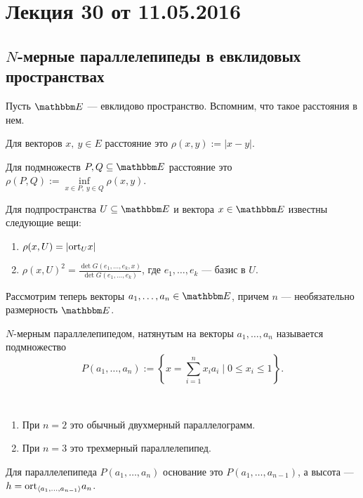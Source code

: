 


\section{Лекция 30 от 11.05.2016}

\subsection*{$N$-мерные параллелепипеды в евклидовых пространствах}

Пусть $\E$ --- евклидово пространство. Вспомним, что такое расстояния в нем.

Для векторов $x,\ y \in E$ расстояние это $\rho(x, y):= |x - y|$.

Для подмножеств $P, Q \subseteq \E$ расстояние это $\rho(P, Q) := \inf\limits_{x \in P,\ y \in Q} \rho(x, y)$.

Для подпространства $U \subseteq \E$ и вектора $x \in \E$ известны следующие вещи:
\begin{enumerate}
\item $\rho(x, U) = |\mathrm{ort}_Ux|$
\item $\rho(x, U)^2 = \frac{\det G(e_1, \ldots, e_k, x)}{\det G(e_1, \ldots, e_k)}$, где $e_1, \ldots, e_k$ --- базис в $U$.
\end{enumerate}

Рассмотрим теперь векторы $a_1, \ldots, a_n \in \E$, причем $n$ --- необязательно размерность $\E$.
\begin{Def}
$N$-мерным параллелепипедом, натянутым на векторы $a_1, \ldots, a_n$ называется подмножество 
$$
P(a_1, \ldots, a_n) := \left\{ x = \sum_{i = 1}^n x_ia_i \mid 0 \leqslant x_i \leqslant 1 \right\}.
$$  
\end{Def}

\begin{Examples}\
\begin{enumerate}
\item При $n = 2$ это обычный двухмерный параллелограмм.
\item При $n = 3$ это трехмерный параллелепипед.
\end{enumerate}
\end{Examples}

\begin{Def}
Для параллелепипеда $P(a_1, \ldots, a_{n})$ основание это $P(a_1, \ldots, a_{n-1})$, а высота --- $h = \mathrm{ort}_{\langle a_1, \ldots, a_{n-1}\rangle}a_n$.
\end{Def}

